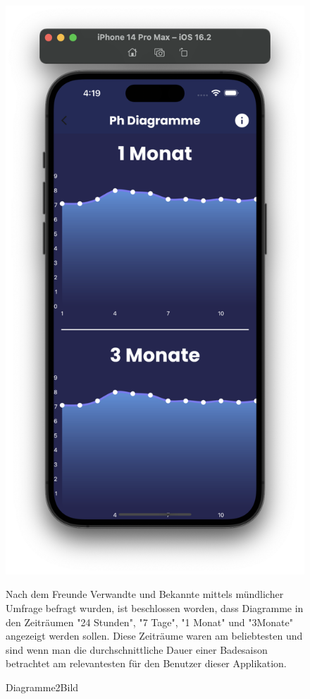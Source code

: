 \begin{figure}[h!]
    \begin{minipage}[c]{0.4\textwidth}
      \includegraphics[width=\textwidth]{./pics/Diagramme2Bild.png}
      \caption{Diagramme2Bild}
    \end{minipage}
    \begin{minipage}[c]{0.5\textwidth}
      \label{fig:DiagrammeApp2}
      Nach dem Freunde Verwandte und Bekannte mittels mündlicher Umfrage befragt wurden, ist beschlossen worden, dass
      Diagramme in den Zeiträumen "24 Stunden", "7 Tage", "1 Monat" und "3Monate" angezeigt werden sollen.
      Diese Zeiträume waren am beliebtesten und sind wenn man die durchschnittliche Dauer einer Badesaison betrachtet am relevantesten
      für den Benutzer dieser Applikation.
    \end{minipage}
\end{figure}
\newpage


